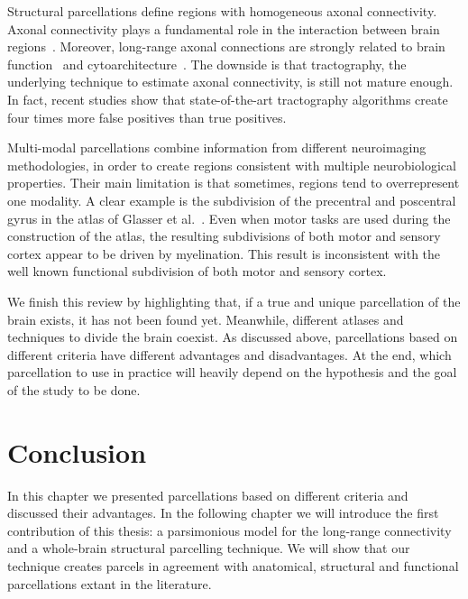Structural parcellations define regions with homogeneous axonal connectivity.
Axonal connectivity plays a fundamental role in the interaction between brain
regions~\citep{Schmahmann2006}. Moreover, long-range axonal connections are
strongly related to brain function~\citep{Passingham2002} and
cytoarchitecture~\cite{Muircheartaigh2018}. The downside is that tractography,
the underlying technique to estimate axonal connectivity, is still 
not mature enough. In fact, recent studies show that state-of-the-art
tractography algorithms create four times more false positives than true
positives.

Multi-modal parcellations combine information from different neuroimaging methodologies,
in order to create regions consistent with multiple neurobiological properties.
Their main limitation is that sometimes, regions tend to overrepresent one
modality. A clear example is the subdivision of the precentral and poscentral
gyrus in the atlas of Glasser et al.~\cite{Glasser2016}. Even when motor tasks
are used during the construction of the atlas, the resulting subdivisions of
both motor and sensory cortex appear to be driven by myelination. This
result is inconsistent with the well known functional subdivision of both motor
and sensory cortex.

We finish this review by highlighting that, if a true and unique parcellation of
the brain exists, it has not been found yet. Meanwhile, different atlases and
techniques to divide the brain coexist. As discussed above, parcellations based
on different criteria have different advantages and disadvantages. At the end,
which parcellation to use in practice will heavily depend on the hypothesis
and the goal of the study to be done.

\section{Conclusion}
In this chapter we presented parcellations based on different criteria and
discussed their advantages. In the following chapter we will introduce the
first contribution of this thesis: a parsimonious model for the long-range
connectivity and a whole-brain structural parcelling technique. We will show
that our technique creates parcels in agreement with anatomical, structural
and functional parcellations extant in the literature.

\chapterbib
